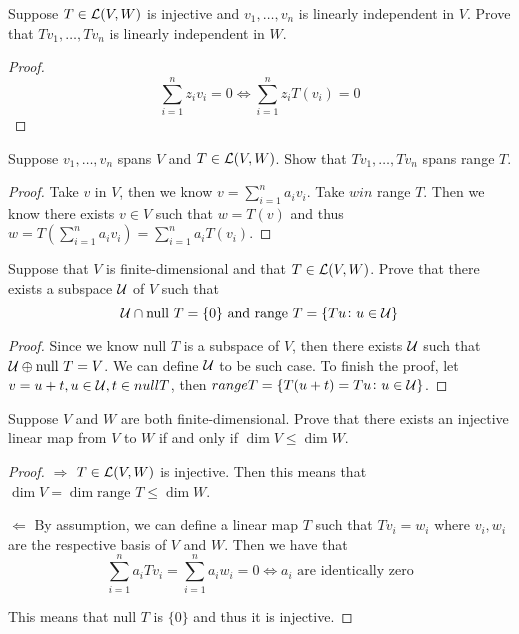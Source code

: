 \documentclass{extarticle}
\begin{document}
\begin{problem}{9}
    Suppose \(T \in \mathcal{L}(V, W)\) is injective and \(v_1, \ldots, v_n\) is 
    linearly independent in \(V\). Prove that \(Tv_1, \ldots, Tv_n\) is 
    linearly independent in \(W\).
\end{problem}

\begin{proof}
\[\sum_{i=1}^{n}z_i v_i = 0 \Longleftrightarrow \sum_{i=1}^{n} z_i T(v_i) = 0\]
\end{proof}

\begin{problem}{10}
    Suppose \(v_1, \ldots, v_n\) spans \(V\) and \(T \in \mathcal{L}(V, W)\). Show 
    that \(Tv_1, \ldots, T v_n\) spans range \(T\). 
\end{problem}

\begin{proof}
Take \(v\) in \(V\), then we know \(v = \sum_{i=1}^{n} a_i v_i\). Take \(w in\) range \(T\).
Then we know there exists \(v \in V\) such that \(w = T(v)\) and 
thus \(w = T(\sum_{i=1}^{n} a_i v_i) = \sum_{i=1}^{n}a_i T(v_i)\). 
\end{proof}

\begin{problem}{11}
    Suppose that \(V\) is finite-dimensional and that \(T \in \mathcal{L}(V, W)\). Prove 
    that there exists a subspace \(\mathcal{U}\) of \(V\) such that 
    \[\mathcal{U} \cap \text{null } T = \{0\} \text{   and   } \text{range } T 
    = \{T u \colon u \in \mathcal{U}\}\]
\end{problem}

\begin{proof}
Since we know null \(T\) is a subspace of \(V\), then there exists \(\mathcal{U}\) 
such that \(\mathcal{U} \oplus \text{null }T = V\). We can define \(\mathcal{U}\) to be such 
case. To finish the proof, let \(v = u + t, u \in \mathcal{U}, t \in null T\), then \(range T 
= \{T(u + t) = T u \colon u \in \mathcal{U}\}\). 
\end{proof}

\begin{problem}{16}
    Suppose \(V\) and \(W\) are both finite-dimensional. Prove that there exists an injective 
    linear map from \(V\) to \(W\) if and only if \(\dim V \leq \dim W\).
\end{problem}

\begin{proof}
\(\Rightarrow\) \(T \in \mathcal{L}(V, W)\) is injective. Then this means that \(\dim V = \dim \text{range } T
\leq \dim W\). 

\(\Leftarrow\) By assumption, we can define a linear map \(T\) such that 
\(T v_i = w_i\) where \(v_i, w_i\) are the respective basis of \(V\) and \(W\). 
Then we have that 
\[\sum_{i=1}^{n} a_i T v_i = \sum_{i=1}^{n} a_i w_i = 0 \Longleftrightarrow a_i \text{ are identically zero} \]

This means that null \(T\) is \(\{0\}\) and thus it is injective. 
\end{proof}
\end{document}
